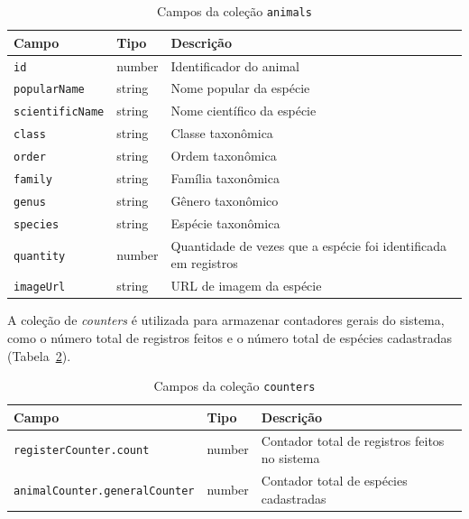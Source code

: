 \begin{table}[H]
    \centering
    \caption{Campos da coleção \texttt{animals}}
    \label{tab:firestore-animals}
    \begin{tabular}{|>{\raggedright\arraybackslash}p{3.5cm}|
                    >{\raggedright\arraybackslash}p{2cm}|
                    >{\raggedright\arraybackslash}p{7cm}|}
        \hline
        \textbf{Campo} & \textbf{Tipo} & \textbf{Descrição} \\ \hline
        \texttt{id} & number & Identificador do animal \\ \hline
        \texttt{popularName} & string & Nome popular da espécie \\ \hline
        \texttt{scientificName} & string & Nome científico da espécie \\ \hline
        \texttt{class} & string & Classe taxonômica \\ \hline
        \texttt{order} & string & Ordem taxonômica \\ \hline
        \texttt{family} & string & Família taxonômica \\ \hline
        \texttt{genus} & string & Gênero taxonômico \\ \hline
        \texttt{species} & string & Espécie taxonômica \\ \hline
        \texttt{quantity} & number & Quantidade de vezes que a espécie foi identificada em registros \\ \hline
        \texttt{imageUrl} & string & URL de imagem da espécie \\ \hline
    \end{tabular}
\end{table}

A coleção de \textit{counters} é utilizada para armazenar contadores gerais 
do sistema, como o número total de registros feitos e o número total de 
espécies cadastradas (Tabela~\ref{tab:firestore-counters}).

\begin{table}[H]
    \centering
    \caption{Campos da coleção \texttt{counters}}
    \label{tab:firestore-counters}
    \begin{tabular}{|>{\raggedright\arraybackslash}p{6cm}|
                    >{\raggedright\arraybackslash}p{2cm}|
                    >{\raggedright\arraybackslash}p{5cm}|}
        \hline
        \textbf{Campo} & \textbf{Tipo} & \textbf{Descrição} \\ \hline
        \texttt{registerCounter.count} & number & Contador total de registros feitos no sistema \\ \hline
        \texttt{animalCounter.generalCounter} & number & Contador total de espécies cadastradas \\ \hline
    \end{tabular}
\end{table}

